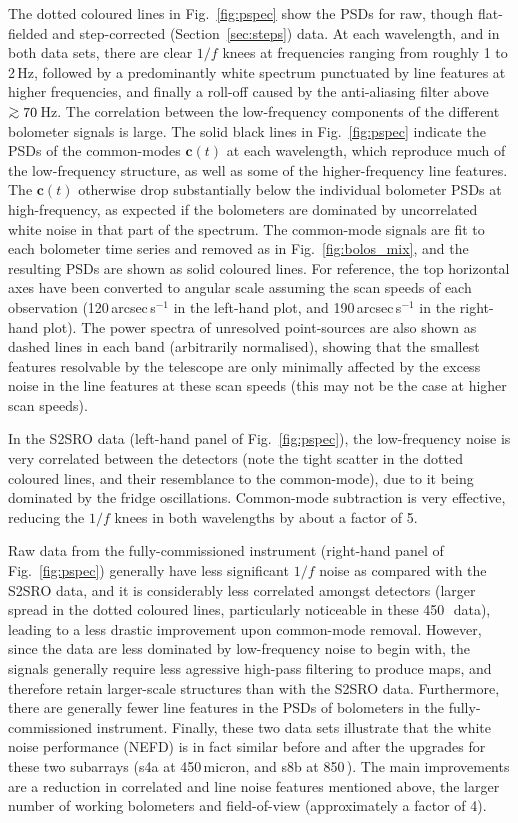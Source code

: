 \documentclass[useAMS,usenatbib,nofootinbib]{mn2e}
\def\gsim{\mathrel{\lower2.5pt\vbox{\lineskip=0pt\baselineskip=0pt
          \hbox{$>$}\hbox{$\sim$}}}}
\begin{document}
The dotted coloured lines in Fig.~\ref{fig:pspec} show the PSDs for
raw, though flat-fielded and step-corrected (Section~\ref{sec:steps})
data. At each wavelength, and in both data sets, there are clear $1/f$
knees at frequencies ranging from roughly 1 to 2\,Hz, followed by a
predominantly white spectrum punctuated by line features at higher
frequencies, and finally a roll-off caused by the anti-aliasing filter
above $\gsim 70$\,Hz. The correlation between the low-frequency
components of the different bolometer signals is large. The solid
black lines in Fig.~\ref{fig:pspec} indicate the PSDs of the
common-modes $\mathbf{c}(t)$ at each wavelength, which reproduce much
of the low-frequency structure, as well as some of the
higher-frequency line features. The $\mathbf{c}(t)$ otherwise drop
substantially below the individual bolometer PSDs at high-frequency,
as expected if the bolometers are dominated by uncorrelated white
noise in that part of the spectrum. The common-mode signals are fit to
each bolometer time series and removed as in Fig.~\ref{fig:bolos_mix},
and the resulting PSDs are shown as solid coloured lines.  For
reference, the top horizontal axes have been converted to angular
scale assuming the scan speeds of each observation
(120\,arcsec\,s$^{-1}$ in the left-hand plot, and
190\,arcsec\,s$^{-1}$ in the right-hand plot). The power spectra of
unresolved point-sources are also shown as dashed lines in each band
(arbitrarily normalised), showing that the smallest features
resolvable by the telescope are only minimally affected by the excess
noise in the line features at these scan speeds (this may not be the
case at higher scan speeds).

In the S2SRO data (left-hand panel of Fig.~\ref{fig:pspec}), the
low-frequency noise is very correlated between the detectors (note the
tight scatter in the dotted coloured lines, and their resemblance to the
common-mode), due to it being dominated by the fridge
oscillations. Common-mode subtraction is very effective, reducing the
$1/f$ knees in both wavelengths by about a factor of 5.

Raw data from the fully-commissioned instrument (right-hand panel of
Fig.~\ref{fig:pspec}) generally have less significant $1/f$ noise as
compared with the S2SRO data, and it is considerably less correlated
amongst detectors (larger spread in the dotted coloured lines,
particularly noticeable in these 450\,\micron\ data), leading to a
less drastic improvement upon common-mode removal. However, since the
data are less dominated by low-frequency noise to begin with, the
signals generally require less agressive high-pass filtering to
produce maps, and therefore retain larger-scale structures than with
the S2SRO data. Furthermore, there are generally fewer line features
in the PSDs of bolometers in the fully-commissioned
instrument. Finally, these two data sets illustrate that the white
noise performance (NEFD) is in fact similar before and after the
upgrades for these two subarrays (s4a at 450\,micron, and s8b at
850\,\micron). The main improvements are a reduction in correlated and
line noise features mentioned above, the larger number of working
bolometers and field-of-view (approximately a factor of 4).
\end{document}
